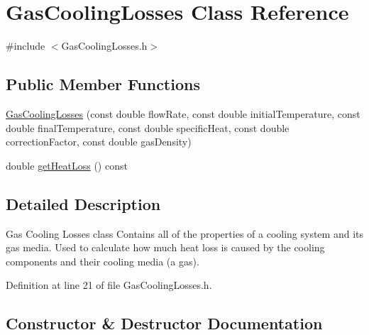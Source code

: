\hypertarget{class_gas_cooling_losses}{}\section{Gas\+Cooling\+Losses Class Reference}
\label{class_gas_cooling_losses}


{\ttfamily \#include $<$Gas\+Cooling\+Losses.\+h$>$}

\subsection*{Public Member Functions}
\begin{DoxyCompactItemize}
\item 
\hyperlink{class_gas_cooling_losses_a0afd445c71ebcc1b8de23adeb15741b6}{Gas\+Cooling\+Losses} (const double flow\+Rate, const double initial\+Temperature, const double final\+Temperature, const double specific\+Heat, const double correction\+Factor, const double gas\+Density)
\item 
double \hyperlink{class_gas_cooling_losses_a3c18b6d1ef3124d883daf85560ec7bd7}{get\+Heat\+Loss} () const
\end{DoxyCompactItemize}


\subsection{Detailed Description}
Gas Cooling Losses class Contains all of the properties of a cooling system and its gas media. Used to calculate how much heat loss is caused by the cooling components and their cooling media (a gas). 

Definition at line 21 of file Gas\+Cooling\+Losses.\+h.



\subsection{Constructor \& Destructor Documentation}
\mbox{\label{class_gas_cooling_losses_a0afd445c71ebcc1b8de23adeb15741b6}} 
